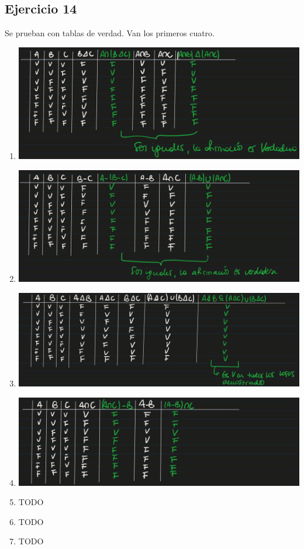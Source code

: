 \subsection{Ejercicio 14}
Se prueban con tablas de verdad. Van los primeros cuatro.
\begin{enumerate}[label=(\alph*)]
    \item \includegraphics[width=500px]{1.14.1}
    \item \includegraphics[width=500px]{1.14.2}
    \item \includegraphics[width=500px]{1.14.3}
    \item \includegraphics[width=500px]{1.14.4}
    \item TODO
    \item TODO
    \item TODO
\end{enumerate}

